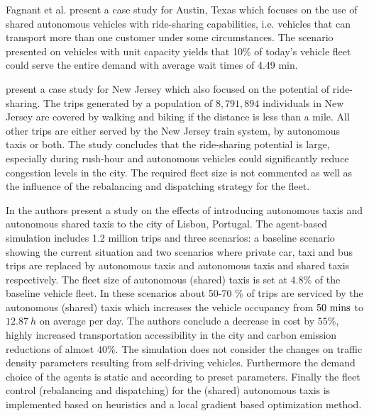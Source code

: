 Fagnant et al. \cite{fagnant2015dynamic} present a case study for Austin, Texas
which focuses on the use of shared autonomous vehicles with ride-sharing capabilities,
i.e. vehicles that can transport more than one customer under some circumstances.
The scenario presented on vehicles with unit capacity yields that 10\% of today's
vehicle fleet could serve the entire demand with average wait times of 4.49 min.

\cite{zachariah2014uncongested} present a case study for New Jersey which also focused
on the potential of ride-sharing. The trips generated by a population of $8,791,894$
individuals in New Jersey are covered by walking and biking if the distance is
less than a mile. All other trips are either served by the New Jersey train system,
by autonomous taxis or both. The study concludes that the ride-sharing potential
is large, especially during rush-hour and autonomous vehicles could significantly
reduce congestion levels in the city. The required fleet size is not commented
as well as the influence of the rebalancing and dispatching strategy for the fleet.

In \cite{martinez2017assessing} the authors present a study on the effects of
introducing autonomous taxis and autonomous shared taxis to the city of Lisbon,
Portugal. The agent-based simulation includes 1.2 million trips and three scenarios:
a baseline scenario showing the current situation and two scenarios where private car,
taxi and bus trips are replaced by autonomous taxis and autonomous taxis and shared
taxis respectively. The fleet size of autonomous (shared) taxis is set at $4.8\%$ of
the baseline vehicle fleet. In these scenarios about 50-70 \% of trips are serviced
by the autonomous (shared) taxis which increases the vehicle occupancy
from $50 ~ \textnormal{mins}$ to $12.87 ~ h$ on average per day. The authors conclude
a decrease in cost by $55 \%$, highly increased transportation
accessibility in the city and carbon emission reductions of almost $40\%$. The
simulation does not consider the changes on traffic density parameters resulting
from self-driving vehicles. Furthermore the demand choice of the agents is static
and according to preset parameters. Finally the fleet control (rebalancing and dispatching)
for the (shared) autonomous taxis is implemented based on heuristics and a local
gradient based optimization method.

